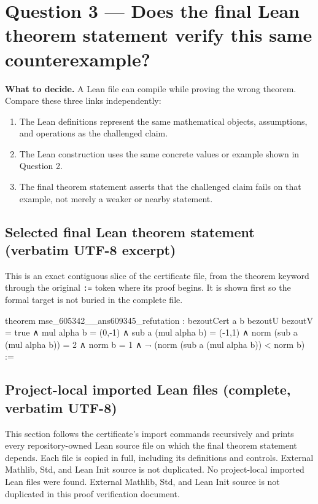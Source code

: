\documentclass[11pt]{article}
\begin{document}
\section*{Question 3 --- Does the final Lean theorem statement verify this same counterexample?}
\textbf{What to decide.} A Lean file can compile while proving the wrong theorem. Compare these three links independently:
\begin{enumerate}
\item The Lean definitions represent the same mathematical objects, assumptions, and operations as the challenged claim.
\item The Lean construction uses the same concrete values or example shown in Question 2.
\item The final theorem statement asserts that the challenged claim fails on that example, not merely a weaker or nearby statement.
\end{enumerate}
\subsection*{Selected final Lean theorem statement (verbatim UTF-8 excerpt)}
This is an exact contiguous slice of the certificate file, from the theorem keyword through the original \texttt{:=} token where its proof begins. It is shown first so the formal target is not buried in the complete file.
\begin{Vlean}
theorem mse_605342__ans609345_refutation :
    bezoutCert a b bezoutU bezoutV = true
      ∧ mul alpha b = (0,-1)
      ∧ sub a (mul alpha b) = (-1,1)
      ∧ norm (sub a (mul alpha b)) = 2
      ∧ norm b = 1
      ∧ ¬ (norm (sub a (mul alpha b)) < norm b) :=
\end{Vlean}
\subsection*{Project-local imported Lean files (complete, verbatim UTF-8)}
This section follows the certificate's import commands recursively and prints every repository-owned Lean source file on which the final theorem statement depends. Each file is copied in full, including its definitions and controls. External Mathlib, Std, and Lean Init source is not duplicated.
No project-local imported Lean files were found. External Mathlib, Std, and Lean Init source is not duplicated in this proof verification document.
\end{document}
